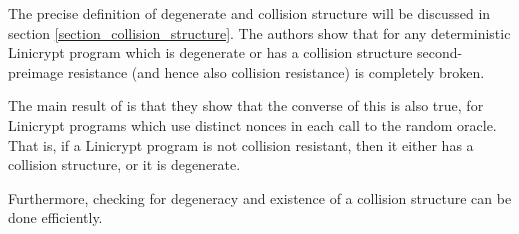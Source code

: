 \begin{pchstack}[center,space=2cm]
\end{pchstack}

The precise definition of degenerate and collision structure will be discussed in section \ref{section_collision_structure}.
The authors show that for any deterministic Linicrypt program which is degenerate
or has a collision structure
second-preimage resistance (and hence also collision resistance) is completely broken.

The main result of \cite{C:CarRos16} is that they show that the converse of this is also true,
for Linicrypt programs which use distinct nonces in each call to the random oracle.
That is, if a Linicrypt program is not collision resistant,
then it either has a collision structure, or it is degenerate.

Furthermore, checking for degeneracy and existence of a collision structure can be done efficiently.
